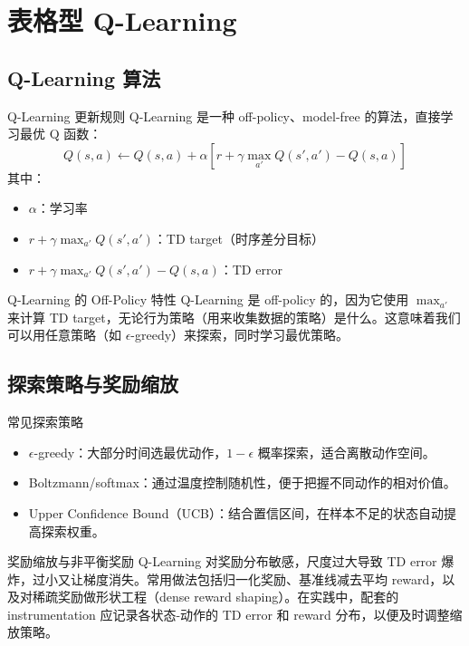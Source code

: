 \section{表格型 Q-Learning}

\subsection{Q-Learning 算法}

\begin{importantbox}{Q-Learning 更新规则}
Q-Learning 是一种 off-policy、model-free 的算法，直接学习最优 Q 函数：
$$Q(s, a) \leftarrow Q(s, a) + \alpha \left[r + \gamma \max_{a'} Q(s', a') - Q(s, a)\right]$$
其中：
\begin{itemize}
    \item $\alpha$：学习率
    \item $r + \gamma \max_{a'} Q(s', a')$：TD target（时序差分目标）
    \item $r + \gamma \max_{a'} Q(s', a') - Q(s, a)$：TD error
\end{itemize}
\end{importantbox}

\begin{knowledgebox}{Q-Learning 的 Off-Policy 特性}
Q-Learning 是 off-policy 的，因为它使用 $\max_{a'}$ 来计算 TD target，无论行为策略（用来收集数据的策略）是什么。这意味着我们可以用任意策略（如 $\epsilon$-greedy）来探索，同时学习最优策略。
\end{knowledgebox}

\subsection{探索策略与奖励缩放}

\begin{knowledgebox}{常见探索策略}
\begin{itemize}
    \item $\epsilon$-greedy：大部分时间选最优动作，$1-\epsilon$ 概率探索，适合离散动作空间。
    \item Boltzmann/softmax：通过温度控制随机性，便于把握不同动作的相对价值。
    \item Upper Confidence Bound（UCB）：结合置信区间，在样本不足的状态自动提高探索权重。
\end{itemize}
\end{knowledgebox}

\begin{importantbox}{奖励缩放与非平衡奖励}
Q-Learning 对奖励分布敏感，尺度过大导致 TD error 爆炸，过小又让梯度消失。常用做法包括归一化奖励、基准线减去平均 reward，以及对稀疏奖励做形状工程（dense reward shaping）。在实践中，配套的 instrumentation 应记录各状态-动作的 TD error 和 reward 分布，以便及时调整缩放策略。
\end{importantbox}

